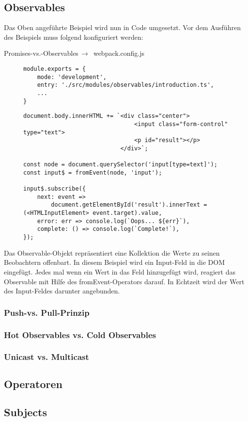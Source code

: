 \subsection{Observables}
Das Oben angeführte Beispiel wird nun in Code umgesetzt. Vor dem Ausführen des Beispiels muss folgend konfiguriert werden:

 \begin{center}
     Promises-vs.-Observables$\,\to\,$ webpack.config.js
 \end{center}
 
 \begin{figure}[H]
\begin{lstlisting}[basicstyle=\small]
module.exports = {
    mode: 'development',
    entry: './src/modules/observables/introduction.ts',
    ...
}
\end{lstlisting}
\end{figure}

 \begin{figure}[H]
\begin{lstlisting}[basicstyle=\small]
document.body.innerHTML += `<div class="center">
                                <input class="form-control" type="text">
                                <p id="result"></p>
                            </div>`;

const node = document.querySelector('input[type=text]');
const input$ = fromEvent(node, 'input');

input$.subscribe({
    next: event =>
        document.getElementById('result').innerText = (<HTMLInputElement> event.target).value,
    error: err => console.log(`Oops... ${err}`),
    complete: () => console.log(`Complete!`),
});
\end{lstlisting}
\end{figure}

\noindent
Das Observable-Objekt repräsentiert eine Kollektion die Werte zu seinen Beobachtern offenbart. In diesem Beispiel wird ein Input-Feld in die DOM eingefügt. Jedes mal wenn ein Wert in das Feld hinzugefügt wird, reagiert das Observable mit Hilfe des fromEvent-Operators darauf. In Echtzeit wird der Wert des Input-Feldes darunter angebunden.

\subsubsection{Push-vs. Pull-Prinzip}
\subsubsection{Hot Observables vs. Cold Observables}
\subsubsection{Unicast vs. Multicast}
\subsection{Operatoren}
\subsection{Subjects}









